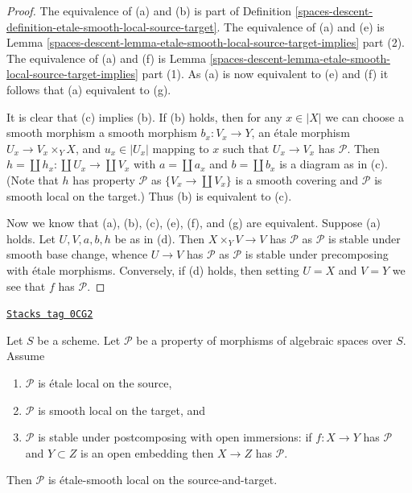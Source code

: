 \begin{proof}
The equivalence of (a) and (b) is part of
Definition \ref{spaces-descent-definition-etale-smooth-local-source-target}.
The equivalence of (a) and (e) is
Lemma \ref{spaces-descent-lemma-etale-smooth-local-source-target-implies} part (2).
The equivalence of (a) and (f) is
Lemma \ref{spaces-descent-lemma-etale-smooth-local-source-target-implies} part (1).
As (a) is now equivalent to (e) and (f) it follows that
(a) equivalent to (g).

\medskip\noindent
It is clear that (c) implies (b). If (b) holds, then for any
$x \in |X|$ we can choose a smooth morphism a smooth morphism
$b_x : V_x \to Y$, an \'etale morphism $U_x \to V_x \times_Y X$,
and $u_x \in |U_x|$ mapping to $x$
such that $U_x \to V_x$ has $\mathcal{P}$.
Then $h = \coprod h_x : \coprod U_x \to \coprod V_x$
with $a = \coprod a_x$ and $b = \coprod b_x$ is a diagram as in (c).
(Note that $h$ has property $\mathcal{P}$ as $\{V_x \to \coprod V_x\}$
is a smooth covering and $\mathcal{P}$ is smooth local on the target.)
Thus (b) is equivalent to (c).

\medskip\noindent
Now we know that (a), (b), (c), (e), (f), and (g) are equivalent.
Suppose (a) holds. Let $U, V, a, b, h$ be as in (d). Then
$X \times_Y V \to V$ has $\mathcal{P}$ as $\mathcal{P}$ is stable under
smooth base change, whence $U \to V$ has $\mathcal{P}$ as $\mathcal{P}$
is stable under precomposing with \'etale morphisms. Conversely, if (d)
holds, then setting $U = X$ and $V = Y$ we see that $f$ has $\mathcal{P}$.
\end{proof}

\begin{lemma}
\label{spaces-descent-lemma-etale-smooth-local-source-target}
\href{https://stacks.math.columbia.edu/tag/0CG2}{\texttt{Stacks tag 0CG2}}

Let $S$ be a scheme.
Let $\mathcal{P}$ be a property of morphisms of algebraic spaces over $S$.
Assume
\begin{enumerate}
\item $\mathcal{P}$ is \'etale local on the source,
\item $\mathcal{P}$ is smooth local on the target, and
\item $\mathcal{P}$ is stable under postcomposing with open immersions:
if $f : X \to Y$ has $\mathcal{P}$ and $Y \subset Z$ is an open embedding
then $X \to Z$ has $\mathcal{P}$.
\end{enumerate}
Then $\mathcal{P}$ is \'etale-smooth local on the source-and-target.
\end{lemma}

